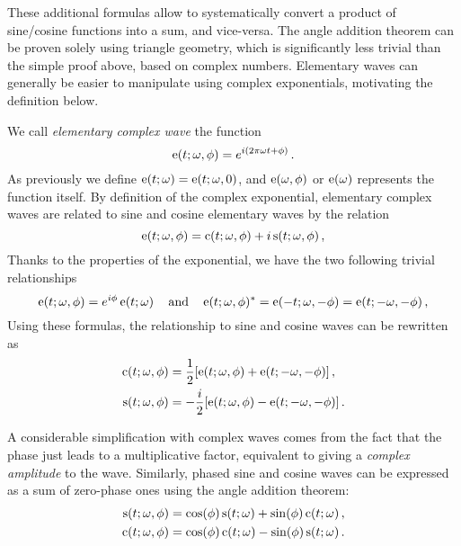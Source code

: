 These additional formulas allow to systematically convert a product of sine/cosine
functions into a sum, and vice-versa. The angle addition theorem can be proven solely
using triangle geometry, which is significantly less trivial than the simple proof above,
based on complex numbers. Elementary waves can generally be easier to manipulate using
complex exponentials, motivating the definition below.
\begin{definition}
  \label{def:complex-wave}
  We call \emph{elementary complex wave} the function
  \begin{equation}
    \operatorname{e}(t;\omega,\phi)=e^{i(2\pi\omega t + \phi)}\,.
  \end{equation}
  As previously we define $\operatorname{e}(t;\omega)=\operatorname{e}(t;\omega,0)$, and $\operatorname{e}(\omega,\phi)$ or
  $\operatorname{e}(\omega)$ represents the function itself. By definition of the complex exponential,
  elementary complex waves are related to sine and cosine elementary waves by the relation
  \begin{equation}
    \operatorname{e}(t;\omega,\phi)=\operatorname{c}(t;\omega,\phi)+i\operatorname{s}(t;\omega,\phi)\,,
  \end{equation}
  Thanks to the properties of the exponential, we have the two following trivial
  relationships
  \begin{equation}
    \operatorname{e}(t;\omega,\phi)=e^{i\phi}\operatorname{e}(t;\omega)\,\quad\text{and}\quad
    \operatorname{e}(t;\omega,\phi)^*=\operatorname{e}(-t;\omega,-\phi)=\operatorname{e}(t;-\omega,-\phi)\,,\label{eq:cw-conj}
  \end{equation}
  Using these formulas, the relationship to sine and cosine waves can be rewritten as
  \begin{align}
    \operatorname{c}(t;\omega,\phi)&=\frac{1}{2}[\operatorname{e}(t;\omega,\phi)+\operatorname{e}(t;-\omega,-\phi)]\,,
    \label{eq:cwtoew}\\
    \operatorname{s}(t;\omega,\phi)&=-\frac{i}{2}[\operatorname{e}(t;\omega,\phi)-\operatorname{e}(t;-\omega,-\phi)]\,.
    \label{eq:swtoew}
  \end{align}
\end{definition}
A considerable simplification with complex waves comes from the fact that the phase just
leads to a multiplicative factor, equivalent to giving a \emph{complex amplitude} to the
wave. Similarly, phased sine and cosine waves can be expressed as a sum of zero-phase ones
using the angle addition theorem:
\begin{align}
  \operatorname{s}(t;\omega,\phi)&=\cos(\phi)\operatorname{s}(t;\omega)+\sin(\phi)\operatorname{c}(t;\omega)\,,\\
  \operatorname{c}(t;\omega,\phi)&=\cos(\phi)\operatorname{c}(t;\omega)-\sin(\phi)\operatorname{s}(t;\omega)\,.
\end{align}
